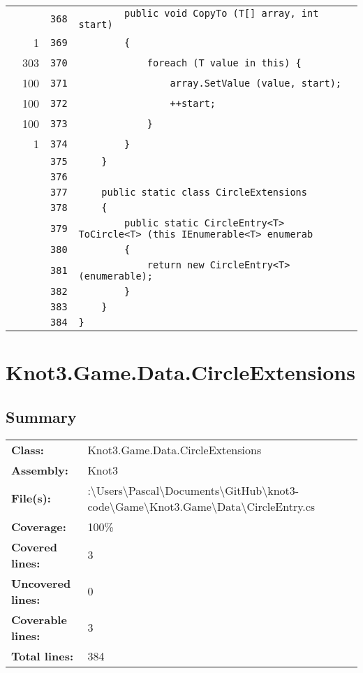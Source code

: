 \documentclass[a4paper,10pt]{article}
\begin{document}
\begin{longtable}[l]{lrrl}
\cellcolor{gray} &  & \verb~368~ & \verb~        public void CopyTo (T[] array, int start)~\\
\cellcolor{green} & 1 & \verb~369~ & \verb~        {~\\
\cellcolor{green} & 303 & \verb~370~ & \verb~            foreach (T value in this) {~\\
\cellcolor{green} & 100 & \verb~371~ & \verb~                array.SetValue (value, start);~\\
\cellcolor{green} & 100 & \verb~372~ & \verb~                ++start;~\\
\cellcolor{green} & 100 & \verb~373~ & \verb~            }~\\
\cellcolor{green} & 1 & \verb~374~ & \verb~        }~\\
\cellcolor{gray} &  & \verb~375~ & \verb~    }~\\
\cellcolor{gray} &  & \verb~376~ & \verb~~\\
\cellcolor{gray} &  & \verb~377~ & \verb~    public static class CircleExtensions~\\
\cellcolor{gray} &  & \verb~378~ & \verb~    {~\\
\cellcolor{gray} &  & \verb~379~ & \verb~        public static CircleEntry<T> ToCircle<T> (this IEnumerable<T> enumerab~\\
\cellcolor{gray} &  & \verb~380~ & \verb~        {~\\
\cellcolor{gray} &  & \verb~381~ & \verb~            return new CircleEntry<T> (enumerable);~\\
\cellcolor{gray} &  & \verb~382~ & \verb~        }~\\
\cellcolor{gray} &  & \verb~383~ & \verb~    }~\\
\cellcolor{gray} &  & \verb~384~ & \verb~}~\\
\end{longtable}
\newpage
\section{Knot3.Game.Data.CircleExtensions}
\subsection{Summary}
\begin{longtable}[l]{ll}
\textbf{Class:} & Knot3.Game.Data.CircleExtensions\\
\textbf{Assembly:} & Knot3\\
\textbf{File(s):} & \begin{minipage}[t]{12cm}{:\textbackslash Users\textbackslash Pascal\textbackslash Documents\textbackslash GitHub\textbackslash knot3-code\textbackslash Game\textbackslash Knot3.Game\textbackslash Data\textbackslash CircleEntry.cs}\end{minipage} \\
\textbf{Coverage:} & 100\%\\
\textbf{Covered lines:} & 3\\
\textbf{Uncovered lines:} & 0\\
\textbf{Coverable lines:} & 3\\
\textbf{Total lines:} & 384\\
\end{longtable}
\end{document}
